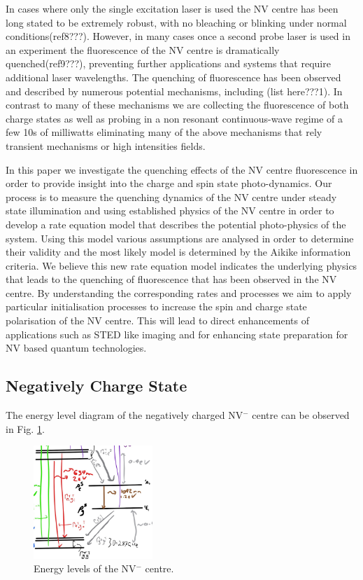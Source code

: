 \documentclass[,prl,twocolumn]{revtex4}
\begin{document}
In cases where only the single excitation laser is used the NV centre has been long stated to be extremely robust, with no bleaching or blinking under normal conditions(ref8???). However, in many cases once a second probe laser is used in an experiment the fluorescence of the NV centre is dramatically quenched(ref9???), preventing further applications and systems that require additional laser wavelengths. The quenching of fluorescence has been observed and described by numerous potential mechanisms, including (list here???1). In contrast to many of these mechanisms we are collecting the fluorescence of both charge states as well as probing in a non resonant continuous-wave regime of a few 10s of milliwatts eliminating many of the above mechanisms that rely transient mechanisms or high intensities fields. 

In this paper we investigate the quenching effects of the NV centre fluorescence in order to provide insight into the charge and spin state photo-dynamics. Our process is to measure the quenching dynamics of the NV centre under steady state illumination and using established physics of the NV centre in order to develop a rate equation model that describes the potential photo-physics of the system. Using this model various assumptions are analysed in order to determine their validity and the most likely model is determined by the Aikike information criteria. We believe this new rate equation model indicates the underlying physics that leads to the quenching of fluorescence that has been observed in the NV centre. By understanding the corresponding rates and processes we aim to apply particular initialisation processes to increase the spin and charge state polarisation of the NV centre. This will lead to direct enhancements of applications such as STED like imaging and for enhancing state preparation for NV based quantum technologies.


\subsection{Negatively Charge State}
The energy level diagram of the negatively charged NV$^-$ centre  can be observed in Fig. \ref{FigEnergyLevelsNV-}.

\begin{figure}[H]
  \centering
  \includegraphics[width=0.4\textwidth]{NV-.jpg} 
 \caption{Energy levels of the NV$^-$ centre.} \label{FigEnergyLevelsNV-}
\end{figure}
\end{document}
